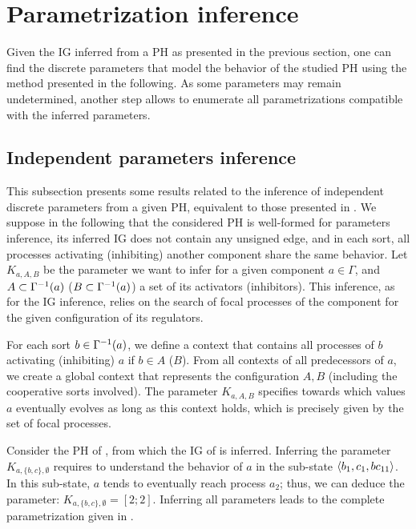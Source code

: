\section{Parametrization inference}\label{sec:infer-K}

Given the IG inferred from a PH as presented in the previous section, one can find the discrete parameters that model the behavior of the studied PH using the method presented in the following.
As some parameters may remain undetermined, another step allows to enumerate all parametrizations compatible with the inferred parameters.

\subsection*{Independent parameters inference}

This subsection presents some results related to the inference of independent discrete parameters from a given PH,
equivalent to those presented in \cite{PMR10-TCSB}.
We suppose in the following that the considered PH is well-formed for parameters inference, \ie its inferred IG does not contain any unsigned edge,
and in each sort, all processes activating (\resp inhibiting) another component share the same behavior.
Let $K_{a,A,B}$ be the parameter we want to infer for a given component $a \in \Gamma$,
and $A \subset \Gamma^{-1}(a)$ (\resp $B \subset \Gamma^{-1}(a)$) a set of its activators (\resp inhibitors).
This inference, as for the IG inference, relies on the search of focal processes of the component for the given configuration of its regulators.

For each sort $b \in \Gamma^{-1}(a)$, we define a context that contains all processes of $b$ activating (\resp inhibiting) $a$ if $b \in A$ (\resp $B$).
From all contexts of all predecessors of $a$, we create a global context that represents the configuration $A,B$ (including the cooperative sorts involved).
The parameter $K_{a,A,B}$ specifies towards which values $a$ eventually evolves as long as this context holds, which is precisely given by the set of focal processes.

\begin{example*}
Consider the PH of , from which the IG of  is inferred.
Inferring the parameter $K_{a,\{b,c\},\emptyset}$ requires to understand the behavior of $a$ in the sub-state $\langle b_1, c_1, bc_{11} \rangle$.
In this sub-state, $a$ tends to eventually reach process $a_2$; thus, we can deduce the parameter: $K_{a,\{b,c\},\emptyset} = [2 ; 2]$.
Inferring all parameters leads to the complete parametrization given in .
\end{example*}

